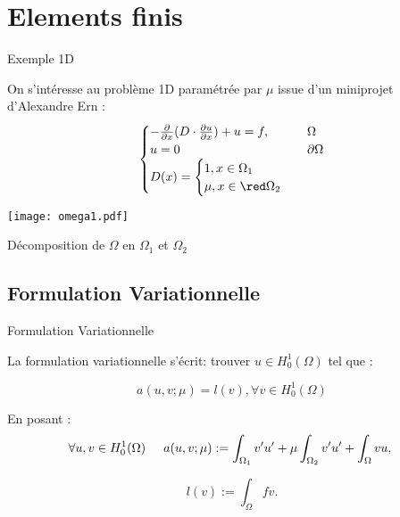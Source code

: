\documentclass[10pt]{beamer}
\begin{document}
\section{Elements finis}


\begin{frame}{Exemple 1D}

On s'intéresse au problème 1D paramétrée par $\mu$ issue d'un miniprojet d'Alexandre Ern \cite{Alexandre Ern}:
\begin{equation*}\label{moneq}
\begin{cases} 
- \frac{\partial }{\partial x}(D \cdot \frac{\partial u}{\partial x}) + u = f ,
 & \Omega   \\
u = 0  & \partial \Omega \\
D(x) = 
\begin{cases} 
1 , x \in \Omega _{1} \\
\mu , x \in \red \Omega _{2}
\end{cases}
\end{cases}
\end{equation*}

\begin{center}
\texttt{[image: omega1.pdf]}
\caption{Décomposition de $\Omega$ en $\Omega_1$ et $\Omega_2$}
\end{center}

\end{frame}

\subsection{Formulation Variationnelle}



\begin{frame}{Formulation Variationnelle}

La formulation variationnelle s'écrit: trouver 
$u \in H_{0}^{1}(\Omega)$ tel que :

\begin{equation*} 
a(u,v;\mu) = l(v) , \forall v \in H_{0}^{1}(\Omega)
\end{equation*}

En posant :
$$
\forall u, v \in H_{0}^{1}(\Omega) 
\hspace{0.5 cm}
a(u,v;\mu) := \int_{\Omega_{1}} v'u' + \mu\int_{\Omega_{2}}v'u' + \int_{\Omega} vu 
\text{, }
$$

$$
l(v) := \int_{\Omega} fv.
$$



\end{frame}
\end{document}
